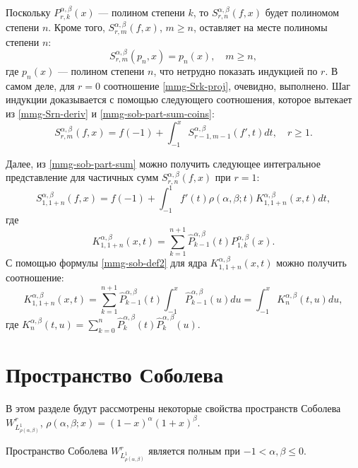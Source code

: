 Поскольку $P^{\alpha,\beta}_{r,k}(x)$ --- полином степени $k$, то $S^{\alpha,\beta}_{r,n}(f,x)$ будет полиномом степени $n$. Кроме того, $S^{\alpha,\beta}_{r,m}(f,x)$, $m \ge n$, оставляет на месте полиномы степени $n$:
\begin{equation}\label{mmg-Srk-proj}
	S^{\alpha,\beta}_{r,m}(p_n,x)=p_n(x), \quad m \ge n,
\end{equation}
где $p_n(x)$ --- полином степени $n$, что нетрудно показать индукцией по $r$. В самом деле, для $r=0$ соотношение \eqref{mmg-Srk-proj}, очевидно, выполнено. Шаг индукции доказывается с помощью следующего соотношения, которое вытекает из \eqref{mmg-Srn-deriv} и \eqref{mmg-sob-part-sum-coins}:
\begin{equation}\label{mmg-Srn-int-1}
	S^{\alpha,\beta}_{r,m}(f,x)=f(-1)+\int_{-1}^x S^{\alpha,\beta}_{r-1,m-1}(f',t)dt, \quad r \ge 1.
\end{equation}

Далее, из \eqref{mmg-sob-part-sum} можно получить следующее интегральное представление для частичных сумм $S^{\alpha,\beta}_{r,n}(f,x)$ при $r=1$:
\begin{equation}\label{mmg-S1n-int-repr}
	S^{\alpha,\beta}_{1,1+n}(f,x) = f(-1)+\int_{-1}^{1}f'(t)\rho(\alpha, \beta; t)K^{\alpha,\beta}_{1,1+n}(x,t)dt,
\end{equation}
где
\begin{equation*}
	K^{\alpha,\beta}_{1,1+n}(x,t)=\sum_{k=1}^{n+1}\hat{P}^{\alpha,\beta}_{k-1}(t)P^{\alpha,\beta}_{1,k}(x).
\end{equation*}
С помощью формулы \eqref{mmg-sob-def2} для ядра $K^{\alpha,\beta}_{1,1+n}(x,t)$ можно получить соотношение:
\begin{equation}\label{mmg-K1n-Kn-repr}
	K^{\alpha,\beta}_{1,1+n}(x,t)=\sum_{k=1}^{n+1}\hat{P}^{\alpha,\beta}_{k-1}(t)\int_{-1}^{x}\hat{P}^{\alpha,\beta}_{k-1}(u)du=\int_{-1}^{x}K^{\alpha,\beta}_n(t,u)du,
\end{equation}
где $K^{\alpha,\beta}_n(t,u)=\sum_{k=0}^{n}\hat{P}^{\alpha,\beta}_{k}(t)\hat{P}^{\alpha,\beta}_{k}(u)$.

\section{Пространство Соболева}
В этом разделе будут рассмотрены некоторые свойства пространств Соболева $W^r_{L^1_{\rho(\alpha, \beta)}}$, $\rho(\alpha, \beta; x)=(1-x)^\alpha(1+x)^\beta$.

\begin{lemma}\label{mmg-complete-W1L1rho}
	Пространство Соболева $W^r_{L^1_{\rho(\alpha, \beta)}}$ является полным при $-1 < \alpha, \beta \le 0$.
\end{lemma}

